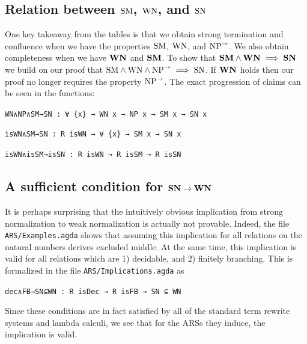 \subsection{Relation between $\mathrm{SM}$, $\mathrm{WN}$, and $\mathrm{SN}$} \label{subsec:SMWNSN}
One key takeaway from the tables is that we obtain strong termination and confluence when we have the properties $\mathrm{SM}$, $\mathrm{WN}$, and $\mathrm{NP}^{\to}$. We also
obtain completeness when we have $\mathbf{WN}$ and $\mathbf{SM}$.
To show that $\mathbf{SM} \land \mathbf{WN} \implies \mathbf{SN}$ we build on our proof that $\mathrm{SM} \land \mathrm{WN} \land \mathrm{NP}^{\to} \implies \mathrm{SN}$. If $\mathbf{WN}$ holds
then our proof no longer requires the property $\mathrm{NP}^{\to}$. The exact progression of claims can be seen in the functions:

\verb|WN∧NP∧SM→SN : ∀ {x} → WN x → NP x → SM x → SN x|

\verb|isWN∧SM→SN : R isWN → ∀ {x} → SM x → SN x|

\verb|isWN∧isSM→isSN : R isWN → R isSM → R isSN|

\subsection{A sufficient condition for $\mathbf{SN} \to \mathbf{WN}$}
\label{sec:SNtoWN}
It is perhaps surprising that the intuitively obvious implication from strong
normalization to weak normalization is actually not provable.
Indeed, the file \texttt{ARS/Examples.agda} shows that assuming this implication 
for all relations on the natural numbers derives excluded middle.
At the same time, this implication is valid for all relations which are
1) decidable, and 2) finitely branching.
This is formalized in the file \texttt{ARS/Implications.agda} as 

\verb|dec∧FB→SN⊆WN : R isDec → R isFB → SN ⊆ WN| 

Since these conditions are in fact satisfied by all of the standard
term rewrite systems and lambda calculi, we see that for the ARSs they induce, the implication
is valid.
